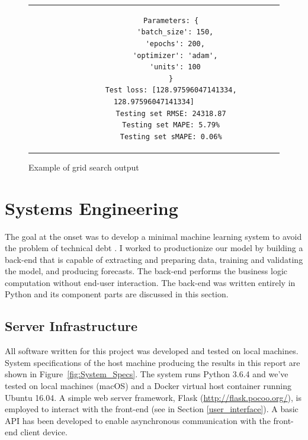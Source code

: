\documentclass[11pt, oneside]{article}
\begin{document}
\begin{figure}[h]
  \caption{Example of grid search output}
  \label{fig:Example_Output}
  \begin{center}
    \begin{tabular}{c}
      \begin{lstlisting}
        Parameters: {
          'batch_size': 150,
          'epochs': 200,
          'optimizer': 'adam',
          'units': 100
        }
        Test loss: [128.97596047141334, 128.97596047141334]
        Testing set RMSE: 24318.87
        Testing set MAPE: 5.79%
        Testing set sMAPE: 0.06%
      \end{lstlisting}
    \end{tabular}
  \end{center}
\end{figure}

\section{Systems Engineering}
The goal at the onset was to develop a minimal machine learning system to avoid the problem of technical debt \cite{sculley}. I worked to productionize our model by building a back-end that is capable of extracting and preparing data, training and validating the model, and producing forecasts. The back-end performs the business logic computation without end-user interaction. The back-end was written entirely in Python and its component parts are discussed in this section.

\subsection{Server Infrastructure}
All software written for this project was developed and tested on local machines. System specifications of the host machine producing the results in this report are shown in Figure~\ref{fig:System_Specs}. The system runs Python 3.6.4 and we've tested on local machines (macOS) and a Docker virtual host container running Ubuntu 16.04. A simple web server framework, Flask (\url{http://flask.pocoo.org/}), is employed to interact with the front-end (see in Section \ref{user_interface}). A basic API has been developed to enable asynchronous communication with the front-end client device.
\end{document}
